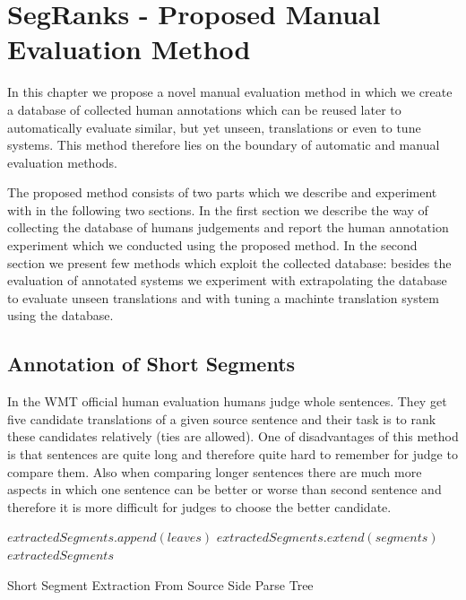 \chapter{SegRanks - Proposed Manual Evaluation Method}

In this chapter we propose a novel manual evaluation method in which we create
a database of collected human annotations which can be reused later to
automatically evaluate similar, but yet unseen, translations or even to tune systems.
This method therefore lies on the boundary of automatic and manual evaluation
methods.

The proposed method consists of two parts which we describe and experiment with
in the following two sections. In the first section we describe the way of
collecting the database of humans judgements and report the human annotation
experiment which we conducted using the proposed method. In the second section
we present few methods which exploit the collected database: besides the
evaluation of annotated systems we experiment with extrapolating the database
to evaluate unseen translations and with tuning a machinte translation system
using the database.

\section{Annotation of Short Segments}

In the WMT official human evaluation humans judge whole sentences. They get
five candidate translations of a given source sentence and their task is to
rank these candidates relatively (ties are allowed). One of disadvantages of
this method is that sentences are quite long and therefore quite hard to
remember for judge to compare them. Also when comparing longer sentences there
are much more aspects in which one sentence can be better or worse than second
sentence and therefore it is more difficult for judges to choose the better
candidate. 

\begin{algorithm}
    \begin{algorithmic}[1]
                    \State $extractedSegments.append(leaves)$
                \EndIf
            \Else
                \State $extractedSegments.extend(segments)$
                \EndFor
            \EndIf
            \Return $extractedSegments$
        \EndFunction
    \end{algorithmic}
    \caption{Short Segment Extraction From Source Side Parse Tree}
    \label{segment:extraction}
\end{algorithm}

